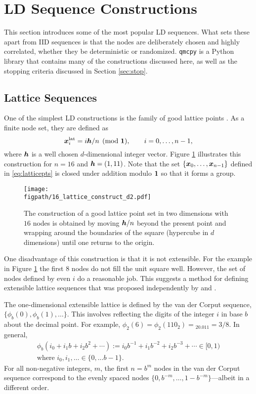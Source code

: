 \documentclass{svproc}
\newcommand{\figpath}{Figures}
\begin{document}
\section{LD Sequence Constructions} \label{sec:construct}
This section introduces some of the most popular LD sequences.  What sets these apart from IID sequences is that the nodes are deliberately chosen and highly correlated, whether they be deterministic or randomized. \texttt{qmcpy} \cite{QMCPy2020a} is a Python library that contains many of the constructions discussed here, as well as the stopping criteria discussed in Section \ref{sec:stop}.

\subsection{Lattice Sequences} \label{sec:lattice}
One of the simplest LD constructions is the family of good lattice points \cite{DicEtal22a,SloJoe94}.  As a finite node set, they are defined as
\begin{equation} \label{eq:latticepts}
	{\boldsymbol{x}}_i^{\text{lat}} = i{\boldsymbol{h}}/n \pmod {{\boldsymbol{1}}}, \qquad i = 0, \ldots, n-1,
\end{equation}
where ${\boldsymbol{h}}$ is a well chosen $d$-dimensional integer vector. Figure \ref{fig:latticeconstruct} illustrates this construction for $n = 16$ and ${\boldsymbol{h}} = (1,11)$.  Note that the set $\{{\boldsymbol{x}}_0, \ldots, {\boldsymbol{x}}_{n-1}\}$ defined in \eqref{eq:latticepts} is closed under addition modulo ${\boldsymbol{1}}$ so that it forms a group.


\begin{figure}
	\centering
	\texttt{[image: \\figpath/16\_lattice\_construct\_d2.pdf]}
	\caption{The construction of a good lattice point set in two dimensions with $16$ nodes is obtained by moving ${\boldsymbol{h}}/n$ beyond the present point and wrapping around the boundaries of the square (hypercube in $d$ dimensions) until one returns to the origin. \label{fig:latticeconstruct}}
\end{figure}


One disadvantage of this construction is that it is not extensible. For the example in Figure \ref{fig:latticeconstruct} the first $8$ nodes do not fill the unit square well.  However, the set of nodes defined by even $i$ do a reasonable job.  This suggests a method for defining extensible lattice sequences that was proposed independently by \cite{Mai81a} and \cite{HicEtal00}.

The one-dimensional extensible lattice is defined by the van der Corput sequence, $\{\phi_b(0), \phi_b(1), \ldots\}$.  This involves reflecting the digits of the integer $i$ in base $b$ about the decimal point.  For example, $\phi_2(6) = \phi_2(110_{2}) = {}_20.011 = 3/8$.  In general,
\begin{multline} \label{eq:vdc}
	\phi_b(i_0 + i_1b + i_2 b^2 + \cdots ) := i_0 b^{-1} + i_1 b^{-2} + i_2 b^{-3} + \cdots \in [0,1)
	\\
	 \text{where } i_0, i_1, \ldots \in \{0,\ldots b-1\}.
\end{multline}
For all non-negative integers, $m$, the first $n = b^m$ nodes in the van der Corput sequence correspond to the evenly spaced nodes $\{0, b^{-m}, \ldots, 1 - b^{-m} \}$---albeit in a different order.
\end{document}
